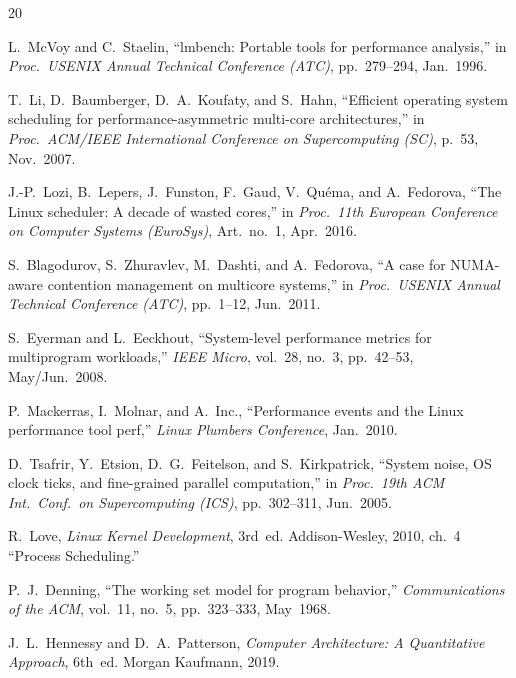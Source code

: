 \documentclass[conference]{IEEEtran}
\begin{document}
\balance
\begin{thebibliography}{20}

L.~McVoy and C.~Staelin,
``lmbench: Portable tools for performance analysis,''
in \emph{Proc.\ USENIX Annual Technical Conference (ATC)},
pp.~279--294, Jan.~1996.

T.~Li, D.~Baumberger, D.~A.~Koufaty, and S.~Hahn,
``Efficient operating system scheduling for performance-asymmetric
multi-core architectures,''
in \emph{Proc.\ ACM/IEEE International Conference on Supercomputing (SC)},
p.~53, Nov.~2007.

J.-P.~Lozi, B.~Lepers, J.~Funston, F.~Gaud, V.~Qu{\'e}ma, and A.~Fedorova,
``The Linux scheduler: A decade of wasted cores,''
in \emph{Proc.\ 11th European Conference on Computer Systems (EuroSys)},
Art.~no.~1, Apr.~2016.

S.~Blagodurov, S.~Zhuravlev, M.~Dashti, and A.~Fedorova,
``A case for NUMA-aware contention management on multicore systems,''
in \emph{Proc.\ USENIX Annual Technical Conference (ATC)},
pp.~1--12, Jun.~2011.

S.~Eyerman and L.~Eeckhout,
``System-level performance metrics for multiprogram workloads,''
\emph{IEEE Micro}, vol.~28, no.~3, pp.~42--53, May/Jun.~2008.

P.~Mackerras, I.~Molnar, and A.~Inc.,
``Performance events and the Linux performance tool perf,''
\emph{Linux Plumbers Conference}, Jan.~2010.

D.~Tsafrir, Y.~Etsion, D.~G.~Feitelson, and S.~Kirkpatrick,
``System noise, OS clock ticks, and fine-grained parallel computation,''
in \emph{Proc.\ 19th ACM Int.\ Conf.\ on Supercomputing (ICS)},
pp.~302--311, Jun.~2005.

R.~Love,
\emph{Linux Kernel Development}, 3rd~ed.
Addison-Wesley, 2010, ch.~4 ``Process Scheduling.''

P.~J.~Denning,
``The working set model for program behavior,''
\emph{Communications of the ACM}, vol.~11, no.~5, pp.~323--333, May~1968.

J.~L.~Hennessy and D.~A.~Patterson,
\emph{Computer Architecture: A Quantitative Approach}, 6th~ed.
Morgan Kaufmann, 2019.


\end{thebibliography}
\end{document}
